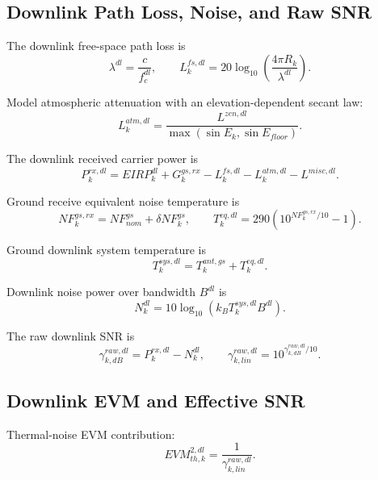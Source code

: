 \documentclass[11pt]{article}
\begin{document}
\subsection{Downlink Path Loss, Noise, and Raw SNR}

The downlink free-space path loss is
\begin{equation}
  \lambda^{dl} = \frac{c}{f_c^{dl}},
  \qquad
  L^{fs,dl}_k = 20 \log_{10}\left( \frac{4\pi R_k}{\lambda^{dl}} \right).
\end{equation}

Model atmospheric attenuation with an elevation-dependent secant law:
\begin{equation}
  L^{atm,dl}_k
  =
  \frac{L^{zen,dl}}{\max(\sin E_k, \sin E_{floor})}.
\end{equation}

The downlink received carrier power is
\begin{equation}
  P^{rx,dl}_k
  =
  EIRP^{dl}_k
  + G^{gs,rx}_k
  - L^{fs,dl}_k
  - L^{atm,dl}_k
  - L^{misc,dl}.
\end{equation}

Ground receive equivalent noise temperature is
\begin{equation}
  NF^{gs,rx}_k = NF^{gs}_{nom} + \delta NF^{gs}_k,
  \qquad
  T^{eq,dl}_k = 290\left(10^{NF^{gs,rx}_k/10} - 1\right).
\end{equation}

Ground downlink system temperature is
\begin{equation}
  T^{sys,dl}_k = T^{ant,gs}_k + T^{eq,dl}_k.
\end{equation}

Downlink noise power over bandwidth $B^{dl}$ is
\begin{equation}
  N^{dl}_k = 10 \log_{10}\left( k_B T^{sys,dl}_k B^{dl} \right).
\end{equation}

The raw downlink SNR is
\begin{equation}
  \gamma^{raw,dl}_{k,dB} = P^{rx,dl}_k - N^{dl}_k,
  \qquad
  \gamma^{raw,dl}_{k,lin} = 10^{\gamma^{raw,dl}_{k,dB}/10}.
\end{equation}

\subsection{Downlink EVM and Effective SNR}

Thermal-noise EVM contribution:
\begin{equation}
  EVM^{2,dl}_{th,k} = \frac{1}{\gamma^{raw,dl}_{k,lin}}.
\end{equation}
\end{document}
